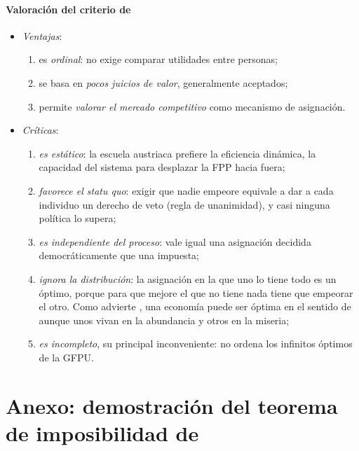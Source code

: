 \documentclass[11pt]{article}
\begin{document}
\paragraph{Valoración del criterio de }

\begin{itemize}
\item \emph{Ventajas}:
  \begin{enumerate}
  \item es \emph{ordinal}: no exige comparar utilidades entre personas;
  \item se basa en \emph{pocos juicios de valor}, generalmente aceptados;
  \item permite \emph{valorar el mercado competitivo} como mecanismo de asignación.
  \end{enumerate}
\item \emph{Críticas}:
  \begin{enumerate}
  \item \emph{es estático}: la escuela austriaca prefiere la eficiencia dinámica, la capacidad del sistema para desplazar la FPP hacia fuera;
  \item \emph{favorece el statu quo}: exigir que nadie empeore equivale a dar a cada individuo un derecho de veto (regla de unanimidad), y casi ninguna política lo supera;
  \item \emph{es independiente del proceso}: vale igual una asignación decidida democráticamente que una impuesta;
  \item \emph{ignora la distribución}: la asignación en la que uno lo tiene todo es un óptimo, porque para que mejore el que no tiene nada tiene que empeorar el otro. Como advierte \textcite{Sen1970Collective}, una economía puede ser óptima en el sentido de  aunque unos vivan en la abundancia y otros en la miseria;
  \item \emph{es incompleto}, su principal inconveniente: no ordena los infinitos óptimos de la GFPU.
  \end{enumerate}
\end{itemize}

\section{Anexo: demostración del teorema de imposibilidad de }\label{anexo:demostracion-arrow}
\end{document}
